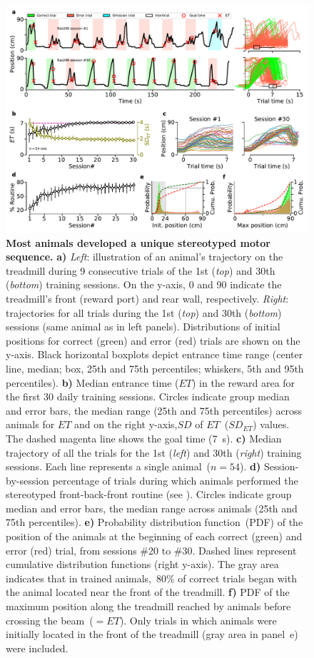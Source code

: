 \begin{figure}[bt!]
    \begin{center}
      \includegraphics[width=.8\linewidth]{ch-time/figures/CtrlTrd.pdf}
      \caption[Control Condition]
      {\textbf{Most animals developed a unique stereotyped motor sequence.}
      \textbf{a)}
      \textit{Left}: illustration of an animal's trajectory on the treadmill during 9 consecutive trials of the 1st (\textit{top}) and 30th (\textit{bottom}) training sessions.
      On the y-axis, 0 and 90 indicate the treadmill's front (reward port) and rear wall, respectively.
      \textit{Right}: trajectories for all trials during the 1st (\textit{top}) and 30th (\textit{bottom}) sessions (same animal as in left panels).
      Distributions of initial positions for correct (green) and error (red) trials are shown on the y-axis.
      Black horizontal boxplots depict entrance time range (center line, median; box, 25th and 75th percentiles; whiskers, 5th and 95th percentiles).
      \textbf{b)}
      Median entrance time ($ET$) in the reward area for the first 30 daily training sessions.
      Circles indicate group median and error bars, the median range (25th and 75th percentiles) across animals for $ET$ and on the right y-axis,$SD$ of $ET$~($SD_{ET}$) values.
      The dashed magenta line shows the goal time (7~s).
      \textbf{c)}
      Median trajectory of all the trials for the 1st (\textit{left}) and 30th (\textit{right}) training sessions.
      Each line represents a single animal~($n=54$).
      \textbf{d)}
      Session-by-session percentage of trials during which animals performed the stereotyped front-back-front routine (see ).
      Circles indicate group median and error bars, the median range across animals (25th and 75th percentiles).
      \textbf{e)}
      Probability distribution function~(PDF) of the position of the animals at the beginning of each correct (green) and error (red) trial, from sessions \#20 to \#30.
      Dashed lines represent cumulative distribution functions (right y-axis).
      The gray area indicates that in trained animals,~80\% of correct trials began with the animal located near the front of the treadmill.
      \textbf{f)}
      PDF of the maximum position along the treadmill reached by animals before crossing the beam~($=ET$).
      Only trials in which animals were initially located in the front of the treadmill (gray area in panel~e) were included.
    }
    \label{fig:time:CtrlTrd}
    \end{center}
  \end{figure}